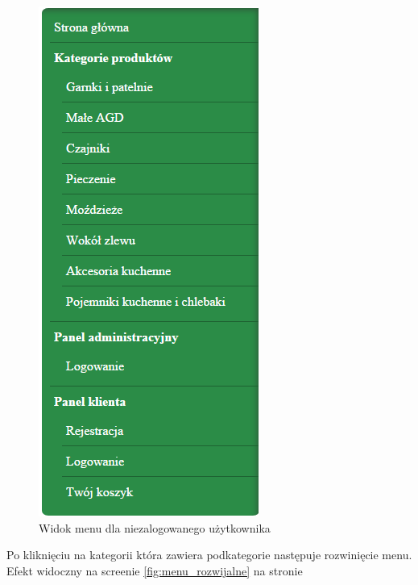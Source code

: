 \begin{figure}[H]
	\centering
	\includegraphics {fig/menu_nie_zalogowany}
	\caption{Widok menu dla niezalogowanego użytkownika}
	\label{fig:nie_zalogowany}
\end{figure}
Po kliknięciu na kategorii która zawiera podkategorie następuje rozwinięcie menu. Efekt widoczny na screenie \ref{fig:menu_rozwijalne} na stronie \pageref{fig:menu_rozwijalne}
